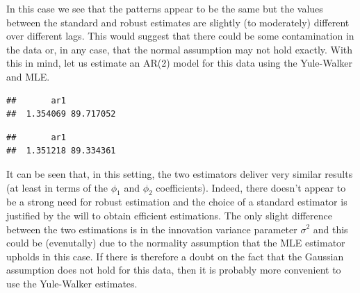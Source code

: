 \documentclass[]{book}
\newenvironment{Shaded}{\begin{snugshade}}{\end{snugshade}}
\newcommand{\KeywordTok}[1]{\textcolor[rgb]{0.13,0.29,0.53}{\textbf{#1}}}
\newcommand{\DataTypeTok}[1]{\textcolor[rgb]{0.13,0.29,0.53}{#1}}
\newcommand{\DecValTok}[1]{\textcolor[rgb]{0.00,0.00,0.81}{#1}}
\newcommand{\StringTok}[1]{\textcolor[rgb]{0.31,0.60,0.02}{#1}}
\newcommand{\CommentTok}[1]{\textcolor[rgb]{0.56,0.35,0.01}{\textit{#1}}}
\newcommand{\OtherTok}[1]{\textcolor[rgb]{0.56,0.35,0.01}{#1}}
\newcommand{\OperatorTok}[1]{\textcolor[rgb]{0.81,0.36,0.00}{\textbf{#1}}}
\newcommand{\NormalTok}[1]{#1}
\theoremstyle{definition}
\theoremstyle{definition}
\theoremstyle{definition}
\theoremstyle{remark}
\begin{document}
In this case we see that the patterns appear to be the same but the
values between the standard and robust estimates are slightly (to
moderately) different over different lags. This would suggest that there
could be some contamination in the data or, in any case, that the normal
assumption may not hold exactly. With this in mind, let us estimate an
AR(2) model for this data using the Yule-Walker and MLE.

\begin{Shaded}
\end{Shaded}

\begin{verbatim}
##       ar1           
##  1.354069 89.717052
\end{verbatim}

\begin{Shaded}
\end{Shaded}

\begin{verbatim}
##       ar1           
##  1.351218 89.334361
\end{verbatim}

It can be seen that, in this setting, the two estimators deliver very
similar results (at least in terms of the \(\phi_1\) and \(\phi_2\)
coefficients). Indeed, there doesn't appear to be a strong need for
robust estimation and the choice of a standard estimator is justified by
the will to obtain efficient estimations. The only slight difference
between the two estimations is in the innovation variance parameter
\(\sigma^2\) and this could be (evenutally) due to the normality
assumption that the MLE estimator upholds in this case. If there is
therefore a doubt on the fact that the Gaussian assumption does not hold
for this data, then it is probably more convenient to use the
Yule-Walker estimates.
\end{document}
